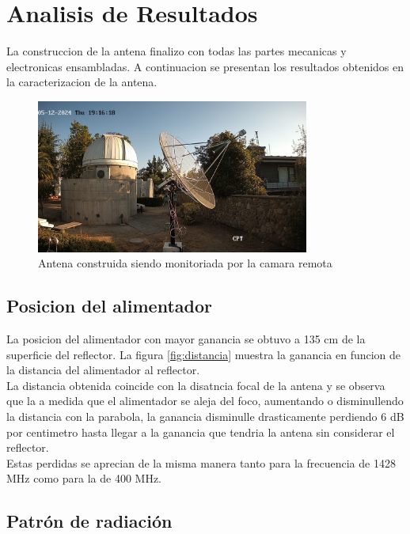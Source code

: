 \chapter{Analisis de Resultados}

La construccion de la antena finalizo con todas las partes mecanicas y electronicas ensambladas. A continuacion se presentan los resultados obtenidos en la caracterizacion de la antena.\\

\begin{figure}
    \centering
    \includegraphics[width=0.8\textwidth]{img/antenna}
    \caption{Antena construida siendo monitoriada por la camara remota}
    \label{fig:antena}
\end{figure}

\section{Posicion del alimentador}

La posicion del alimentador con mayor ganancia se obtuvo a 135 cm de la superficie del reflector. La figura \ref{fig:distancia} muestra la ganancia en funcion de la distancia del alimentador al reflector.\\

La distancia obtenida coincide con la disatncia focal de la antena y se observa que la a medida que el alimentador se aleja del foco, aumentando o disminullendo la distancia con la parabola, la ganancia disminulle drasticamente perdiendo 6 dB por centimetro hasta llegar a la ganancia que tendria la antena sin considerar el reflector.\\

Estas perdidas se aprecian de la misma manera tanto para la frecuencia de 1428 MHz como para la de 400 MHz.\\

\section{Patrón de radiación}

